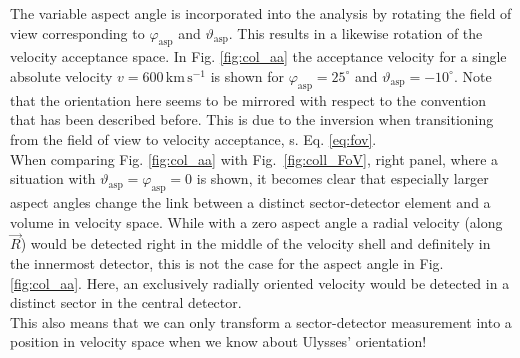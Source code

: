 %
%
%
The variable aspect angle is incorporated into the analysis by rotating the field of view corresponding to $\varphi_{\mathrm{asp}}$ and $\vartheta_{\mathrm{asp}}$. This results in a likewise rotation of the velocity acceptance space. In Fig. \ref{fig:col_aa} the acceptance velocity for a single absolute velocity $v = 600\,\mathrm{km\,s^{-1}}$ is shown for $\varphi_\mathrm{asp} = 25^\circ$ and $\vartheta_{\mathrm{asp}} = -10^\circ $. Note that the orientation here seems to be mirrored with respect to the convention that has been described before. This is due to the inversion when transitioning from the field of view to velocity acceptance, s. Eq. \ref{eq:fov}.\\
When comparing Fig. \ref{fig:col_aa} with Fig.~\ref{fig:coll_FoV}, right panel, where a situation with $\vartheta_{\mathrm{asp}} = \varphi_{\mathrm{asp}} = 0$ is shown, it becomes clear that especially larger aspect angles change the link between a distinct sector-detector element and a volume in velocity space. While with a zero aspect angle a radial velocity (along $\vec{R}$) would be detected right in the middle of the velocity shell and definitely in the innermost detector, this is not the case for the aspect angle in Fig. \ref{fig:col_aa}. Here, an exclusively radially oriented velocity would be detected in a distinct sector in the central detector.\\
This also means that we can only transform a sector-detector measurement into a position in velocity space when we know about Ulysses' orientation!
